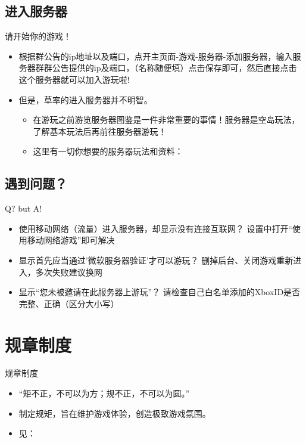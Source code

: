 \documentclass{beamer}
\begin{document}
\subsection{进入服务器}
\begin{frame}{请开始你的游戏！}
    \begin{itemize}
        \item 根据群公告的ip地址以及端口，点开主页面-游戏-服务器-添加服务器，输入服务器群群公告提供的ip及端口，（名称随便填）点击保存即可，然后直接点击这个服务器就可以加入游玩啦!
        \item 但是，草率的进入服务器并不明智。
        \begin{itemize}
            \item 在游玩之前游览服务器图鉴是一件非常重要的事情！服务器是空岛玩法，了解基本玩法后再前往服务器游玩！
            \item 这里有一切你想要的服务器玩法和资料：\href{https://docs.mcnia.top/zh-CN/Illustrated.html}{\color{purple}{NIA 服务器图鉴}}
        \end{itemize}
    \end{itemize}
\end{frame}

\subsection{遇到问题？}
\begin{frame}{Q? but A!}
    \begin{itemize}[<+-| alert@+>]
        \item 使用移动网络（流量）进入服务器，却显示没有连接互联网？\newline 
        设置中打开“使用移动网络游戏”即可解决
        \item 显示首先应当通过'微软服务器验证'才可以游玩？\newline 
        删掉后台、关闭游戏重新进入，多次失败建议换网
        \item 显示“您未被邀请在此服务器上游玩”？\newline 
        请检查自己白名单添加的XboxID是否完整、正确（区分大小写）
    \end{itemize}
\end{frame}

\section{规章制度}
\begin{frame}{规章制度}
    \begin{itemize}[<+-| alert@+>]
        \item “矩不正，不可以为方；规不正，不可以为圆。”
        \item 制定规矩，旨在维护游戏体验，创造极致游戏氛围。
        \item 见：\href{https://docs.mcnia.top/zh-CN/regulation.html}{\color{purple}{NIA 服务器规章制度v3.1}}
    \end{itemize}
\end{frame}
\end{document}
